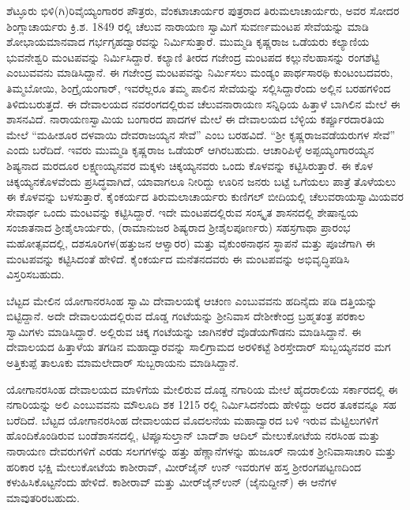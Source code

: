 ಶೆಟ್ಳೂರು ಭಿಳಿ(ಗಿ)ರಿವೈಯ್ಯಂಗಾರರ ಪೌತ್ರರು, ವೆಂಕಟಾಚಾರ್ಯರ ಪುತ್ರರಾದ ತಿರುಮಲಾಚಾರ್ಯರು, ಅವರ ಸೋದರ ಶಿಂಗ್ಲಾಚಾರ್ಯರು ಕ್ರಿ.ಶ. 1849 ರಲ್ಲಿ ಚೆಲುವ ನಾರಾಯಣ ಸ್ವಾಮಿಗೆ ಸುವರ್ಣಮಂಟಪ ಸೇವೆಯನ್ನು ಮಾಡಿ ಶೋಭಾಯಮಾನವಾದ ಗರ್ಭಗೃಹದ್ವಾರವನ್ನು ನಿರ್ಮಿಸುತ್ತಾರೆ. ಮುಮ್ಮಡಿ ಕೃಷ್ಣರಾಜ ಒಡೆಯರು ಕಲ್ಯಾಣಿಯ ಭುವನೇಶ್ವರಿ ಮಂಟಪವನ್ನು ನಿರ್ಮಿಸಿದ್ದಾರೆ. ಕಲ್ಯಾಣಿ ತೀರದ ಗಜೇಂದ್ರ ಮಂಟಪದ ಕಲ್ಲುನೆಲಹಾಸನ್ನು ರಂಗಶೆಟ್ಟಿ ಎಂಬುವವನು ಮಾಡಿಸಿದ್ದಾನೆ. ಈ ಗಜೇಂದ್ರ ಮಂಟಪವನ್ನು ನಿರ್ಮಿಸಲು ಮಂಡ್ಯಂ ಪಾರ್ಥಸಾರಥಿ ಕುಂಟಂಬದವರು, ತಿಮ್ಮಬೋಯಿ, ಶಿಂಗ್ರೈಯಂಗಾರ್​, ಇವರೆಲ್ಲರೂ ತಮ್ಮ ಪಾಲಿನ ಸೇವೆಯನ್ನು ಸಲ್ಲಿಸಿದ್ದಾರೆಂದು ಅಲ್ಲಿನ ಬರಹಗಳಿಂದ ತಿಳಿದುಬರುತ್ತದೆ. ಈ ದೇವಾಲಯದ ನವರಂಗದಲ್ಲಿರುವ ಚೆಲುವನಾರಾಯಣ ಸನ್ನಿಧಿಯ ಹಿತ್ತಾಳೆ ಬಾಗಿಲಿನ ಮೇಲೆ ಈ ಶಾಸನವಿದೆ. ನಾರಾಯಣಸ್ವಾಮಿಯ ಬಂಗಾರದ ಪಾದಗಳ ಮೇಲೆ ಈ ದೇವಾಲಯದ ಬೆಳ್ಳಿಯ ಕರ್ಪ್ಪೂರದಾರತಿಯ ಮೇಲೆ “ಮಹೀಶೂರ ದಳವಾಯಿ ದೇವರಾಜಯ್ಯನ ಸೇವೆ” ಎಂಬ ಬರಹವಿದೆ. “ಶ‍್ರೀ ಕೃಷ್ಣರಾಜವಡೆಯರುಗಳ ಸೇವೆ” ಎಂದು ಬರೆದಿದೆ. ಇವರು ಮುಮ್ಮಡಿ ಕೃಷ್ಣರಾಜ ಒಡೆಯರ್​ ಆಗಿರಬಹುದು. ಆಚಾರಿಪಿಳ್ಳೆ ಅಪ್ಪಯ್ಯಂಗಾರಯ್ಯನ ಶಿಷ್ಯನಾದ ಮರದೂರ ಲಕ್ಷ್ಮಣಯ್ಯನವರ ಮಕ್ಕಳು ಚಿಕ್ಕಯ್ಯನವರು ಒಂದು ಕೊಳವನ್ನು ಕಟ್ಟಿಸಿರುತ್ತಾರೆ. ಈ ಕೊಳ ಚಿಕ್ಕಯ್ಯನಕೊಳವೆಂದು ಪ್ರಸಿದ್ಧವಾಗಿದೆ, ಯಾವಾಗಲೂ ನೀರಿದ್ದು ಊರಿನ ಜನರು ಬಟ್ಟೆ ಒಗೆಯಲು ಪಾತ್ರೆ ತೊಳೆಯಲು ಈ ಕೊಳವನ್ನು ಬಳಸುತ್ತಾರೆ. ಕೈಂಕರ್ಯದ ತಿರುಮಲಾಚಾರ್ಯರು ಕುಣಿಗಲ್​ ಬೀದಿಯಲ್ಲಿ ಚೆಲುವರಾಯಸ್ವಾಮಿಯವರ ಸೇವಾರ್ಥ ಒಂದು ಮಂಟವನ್ನು ಕಟ್ಟಿಸಿದ್ದಾರೆ. ಇದೇ ಮಂಟಪದಲ್ಲಿರುವ ಸಂಸ್ಕೃತ ಶಾಸನದಲ್ಲಿ ಶೇಷಾನ್ವಯ ಸಂಜಾತನಾದ ಶ‍್ರೀಶೈಲಾರ್ಯರು, (ರಾಮಾನುಜರ ಶಿಷ್ಯರಾದ ಶ‍್ರೀಶೈಲಪೂರ್ಣರು) ಸಹಸ್ರಗಾಥಾ ಪ್ರಾರಂಭ ಮಹೋತ್ಸವದಲ್ಲಿ, ದಶಸೂರಿಗಳ(ಹತ್ತುಜನ ಆಳ್ವಾರರ) ಮತ್ತು ವೈಕುಂಠನಾಥನ ಸ್ಥಾಪನೆ ಮತ್ತು ಪೂಜೆಗಾಗಿ ಈ ಮಂಟಪವನ್ನು ಕಟ್ಟಿಸಿದಂತೆ ಹೇಳಿದೆ. ಕೈಂಕರ್ಯದ ಮನೆತನದವರು ಈ ಮಂಟಪವನ್ನು ಅಭಿವೃದ್ಧಿಪಡಿಸಿ ವಿಸ್ತರಿಸಬಹುದು.

ಬೆಟ್ಟದ ಮೇಲಿನ ಯೋಗಾನರಸಿಂಹ ಸ್ವಾಮಿ ದೇವಾಲಯಕ್ಕೆ ಆಚಂಣ ಎಂಬುವವನು ಹದಿನೈದು ಪಡಿ ದತ್ತಿಯನ್ನು ಬಿಟ್ಟಿದ್ದಾನೆ. ಅದೇ ದೇವಾಲಯದಲ್ಲಿರುವ ದೊಡ್ಡ ಗಂಟೆಯನ್ನು ಶ‍್ರೀನಿವಾಸ ದೇಶೀಕೇಂದ್ರ ಬ್ರಹ್ಮತಂತ್ರ ಪರಕಾಲ ಸ್ವಾಮಿಗಳು ಮಾಡಿಸಿದ್ದಾರೆ. ಅಲ್ಲಿರುವ ಚಿಕ್ಕ ಗಂಟೆಯನ್ನು ಜಾಗಿನಕೆರೆ ವೊಡೆಯಗೌಡನು ಮಾಡಿಸಿದ್ದಾನೆ. ಈ ದೇವಾಲಯದ ಹಿತ್ತಾಳೆಯ ತಗಡಿನ ಮಹಾದ್ವಾರವನ್ನು ಸಾಲಿಗ್ರಾಮದ ಅರಳಿಕಟ್ಟೆ ಶಿರಸ್ತೇದಾರ್​ ಸುಬ್ಬಯ್ಯನವರ ಮಗ ಅತ್ತಿಕುಪ್ಪೆ ತಾಲೂಕು ಮಾಮಲೇದಾರ್​ ಸುಬ್ಬರಾಯನು ಮಾಡಿಸಿದ್ದಾನೆ.

ಯೋಗಾನರಸಿಂಹ ದೇವಾಲಯದ ಮಾಳಿಗೆಯ ಮೇಲಿರುವ ದೊಡ್ಡ ನಗಾರಿಯ ಮೇಲೆ ಹೈದರಾಲಿಯ ಸರ್ಕಾರದಲ್ಲಿ ಈ ನಗಾರಿಯನ್ನು ಅಲಿ ಎಂಬುವವನು ಮೌಲೂದಿ ಶಕ 1215 ರಲ್ಲಿ ನಿರ್ಮಿಸಿದನೆಂದು ಹೇಳಿದ್ದು ಅದರ ತೂಕವನ್ನೂ ಸಹ ಬರೆದಿದೆ. ಬೆಟ್ಟದ ಯೋಗಾನರಸಿಂಹ ದೇವಾಲಯದ ಮೊದಲನೆಯ ಮಹಾದ್ವಾರದ ಬಳಿ ಇರುವ ಮೆಟ್ಟಿಲುಗಳಿಗೆ ಹೊಂದಿಕೊಂಡಿರುವ ಬಂಡೆಶಾಸನದಲ್ಲಿ, ಟಿಪ್ಪೂಸುಲ್ತಾನ್​ ಬಾದ್​ಶಾ ಆದಿಲ್​ ಮೇಲುಕೋಟೆಯ ನರಸಿಂಹ ಮತ್ತು ನಾರಾಯಣ ದೇವರುಗಳಿಗೆ ಎರಡು ಸಲಗಗಳನ್ನು ಹತ್ತು ಹೆಣ್ಣಾನೆಗಳನ್ನು ಹುಜೂರ್​ ನಾಯಕ ಶ‍್ರೀನಿವಾಸಾಚಾರಿ ಮತ್ತು ಹರಿಕಾರ ಭಕ್ಷಿ ಮೇಲುಕೋಟೆಯ ಕಾಶೀರಾವ್​, ಮೀರ್​ಜೈನ್​ ಉನ್​ ಇವರುಗಳ ಹಸ್ತ ಶ‍್ರೀರಂಗಪಟ್ಟಣದಿಂದ ಕಳುಹಿಸಿಕೊಟ್ಟನೆಂದು ಹೇಳಿದೆ. ಕಾಶೀರಾವ್​ ಮತ್ತು ಮೀರ್​ಜೈನ್​ಉನ್​ (ಜೈನುದ್ದೀನ್​) ಈ ಆನೆಗಳ ಮಾವುತರಿರಬಹುದು.


